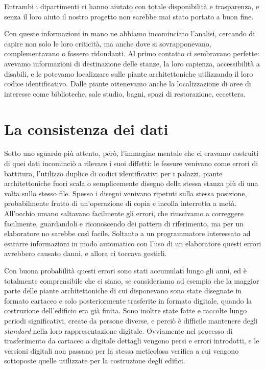 \documentclass[12pt]{report}
\begin{document}
Entrambi i dipartimenti ci hanno aiutato con totale disponibilità e trasparenza, e senza il loro aiuto il nostro progetto non sarebbe mai stato portato a buon fine.

Con queste informazioni in mano ne abbiamo incominciato l'analisi, cercando di capire non solo le loro criticità, ma anche dove si sovrapponevano, complementavano o fossero ridondanti. Al primo contatto ci sembravano perfette: avevamo informazioni di destinazione delle stanze, la loro capienza, accessibilità a disabili, e le potevamo localizzare sulle piante architettoniche utilizzando il loro codice identificativo. Dalle piante ottenevamo anche la localizzazione di aree di interesse come biblioteche, sale studio, bagni, spazi di restorazione, eccettera.


\section{La consistenza dei dati}

Sotto uno sguardo più attento, però, l'immagine mentale che ci eravamo costruiti di quei dati incominciò a rilevare i suoi diffetti: le fessure venivano come errori di battitura, l'utilizzo duplice di codici identificativi per i palazzi, piante architettoniche fuori scala o semplicemente disegno della stessa stanza più di una volta sullo stesso file. Spesso i disegni venivano ripetuti sulla stessa posizione, probabilmente frutto di un'operazione di copia e incolla interrotta a metà. All'occhio umano saltavano facilmente gli errori, che riuscivamo a correggere facilmente, guardandoli e riconoscendo dei pattern di riferimento, ma per un elaboratore no sarebbe così facile. Soltanto a un programmatore interessato ad estrarre informazioni in modo automatico con l'uso di un elaboratore questi errori avrebbero causato danni, e allora ci toccava gestirli.

Con buona probabilità questi errori sono stati accumulati lungo gli anni, ed è totalmente comprensibile che ci siano, se  consideriamo ad esempio che la maggior parte delle piante architettoniche di cui disponevano sono state disegnate in formato cartaceo e solo posteriormente trasferite in formato digitale, quando la costruzione dell'edificio era già finita. Sono inoltre state fatte e raccolte lungo periodi significativi, create da persone diverse, e perciò è difficile mantenere degli \textit{standard} nella loro rappresentazione digitale. Ovviamente nel processo di trasferimento da cartaceo a digitale dettagli vengono persi e errori introdotti, e le versioni digitali non passano per la stessa meticolosa verifica a cui vengono sottoposte quelle utilizzate per la costruzione degli edifici. 
\end{document}
